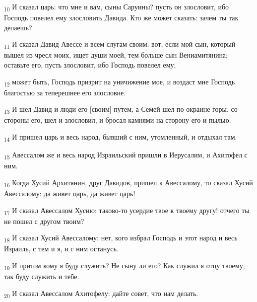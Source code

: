 \begin{tcolorbox}
\textsubscript{10} И сказал царь: что мне и вам, сыны Саруины? пусть он злословит, ибо Господь повелел ему злословить Давида. Кто же может сказать: зачем ты так делаешь?
\end{tcolorbox}
\begin{tcolorbox}
\textsubscript{11} И сказал Давид Авессе и всем слугам своим: вот, если мой сын, который вышел из чресл моих, ищет души моей, тем больше сын Вениамитянина; оставьте его, пусть злословит, ибо Господь повелел ему;
\end{tcolorbox}
\begin{tcolorbox}
\textsubscript{12} может быть, Господь призрит на уничижение мое, и воздаст мне Господь благостью за теперешнее его злословие.
\end{tcolorbox}
\begin{tcolorbox}
\textsubscript{13} И шел Давид и люди его [своим] путем, а Семей шел по окраине горы, со стороны его, шел и злословил, и бросал камнями на сторону его и пылью.
\end{tcolorbox}
\begin{tcolorbox}
\textsubscript{14} И пришел царь и весь народ, бывший с ним, утомленный, и отдыхал там.
\end{tcolorbox}
\begin{tcolorbox}
\textsubscript{15} Авессалом же и весь народ Израильский пришли в Иерусалим, и Ахитофел с ним.
\end{tcolorbox}
\begin{tcolorbox}
\textsubscript{16} Когда Хусий Архитянин, друг Давидов, пришел к Авессалому, то сказал Хусий Авессалому: да живет царь, да живет царь!
\end{tcolorbox}
\begin{tcolorbox}
\textsubscript{17} И сказал Авессалом Хусию: таково-то усердие твое к твоему другу! отчего ты не пошел с другом твоим?
\end{tcolorbox}
\begin{tcolorbox}
\textsubscript{18} И сказал Хусий Авессалому: нет, кого избрал Господь и этот народ и весь Израиль, с тем и я, и с ним останусь.
\end{tcolorbox}
\begin{tcolorbox}
\textsubscript{19} И притом кому я буду служить? Не сыну ли его? Как служил я отцу твоему, так буду служить и тебе.
\end{tcolorbox}
\begin{tcolorbox}
\textsubscript{20} И сказал Авессалом Ахитофелу: дайте совет, что нам делать.
\end{tcolorbox}
